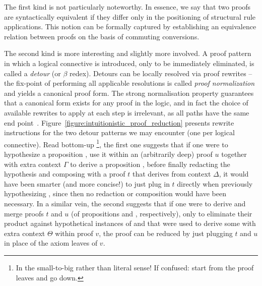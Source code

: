 The first kind is not particularly noteworthy.
In essence, we say that two proofs are syntactically equivalent if they differ only in the positioning of structural rule applications.
This notion can be formally captured by establishing an equivalence relation between proofs on the basis of commuting conversions.

The second kind is more interesting and slightly more involved.
A proof pattern in which a logical connective is introduced, only to be immediately eliminated, is called a \textit{detour} (or $\beta$ redex).
Detours can be locally resolved via proof rewrites -- the fix-point of performing all applicable resolutions is called \textit{proof normalization} and yields a canonical proof form. 
The strong normalisation property guarantees that a canonical form exists for any proof in the logic, and in fact the choice of available rewrites to apply at each step is irrelevant, as all paths have the same end point~\cite{groote1999strong}.
Figure~\ref{figure:intuitionistic_proof_reduction} presents rewrite instructions for the two detour patterns we may encounter (one per logical connective).
Read bottom-up%
\footnote{In the small-to-big rather than literal sense! If confused: start from the proof leaves and go down.},
the first one suggests that if one were to hypothesize a proposition , use it within an (arbitrarily deep) proof $u$ together with extra context $\Gamma$ to derive a proposition , before finally redacting the hypothesis and composing with a proof $t$ that derives  from context $\Delta$, it would have been smarter (and more concise!) to just plug in $t$ directly when previously hypothesizing , since then no redaction or composition would have been necessary.
In a similar vein, the second suggests that if one were to derive and merge proofs $t$ and $u$ (of propositions  and , respectively), only to eliminate their product against hypothetical instances of  and  that were used to derive some  with extra context $\Theta$ within proof $v$, the proof can be reduced by just plugging $t$ and $u$ in place of the axiom leaves of $v$.

